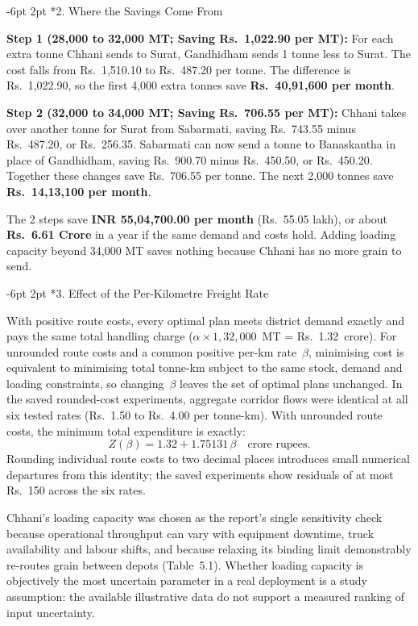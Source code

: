 \documentclass[10pt,a4paper]{article}
\makeatletter
\renewcommand\subsection{\@startsection{subsection}{2}{\z@}%
                                     {-6pt \@plus -2pt \@minus -1pt}%
                                     {2pt \@plus 1pt}%
                                     {\normalfont\large\bfseries}}
\makeatother
\begin{document}
\subsection*{2. Where the Savings Come From}
{\small \textbf{Step 1 (28,000 to 32,000 MT; Saving Rs.~1,022.90 per MT):}
For each extra tonne Chhani sends to Surat, Gandhidham sends 1 tonne less to Surat. The cost falls from Rs.~1,510.10 to Rs.~487.20 per tonne. The difference is Rs.~1,022.90, so the first 4,000 extra tonnes save \textbf{Rs.~40,91,600 per month}.

\textbf{Step 2 (32,000 to 34,000 MT; Saving Rs.~706.55 per MT):}
Chhani takes over another tonne for Surat from Sabarmati, saving Rs.~743.55 minus Rs.~487.20, or Rs.~256.35. Sabarmati can now send a tonne to Banaskantha in place of Gandhidham, saving Rs.~900.70 minus Rs.~450.50, or Rs.~450.20. Together these changes save Rs.~706.55 per tonne. The next 2,000 tonnes save \textbf{Rs.~14,13,100 per month}.

The 2 steps save \textbf{INR 55,04,700.00 per month} (Rs.~55.05 lakh), or about \textbf{Rs.~6.61 Crore} in a year if the same demand and costs hold. Adding loading capacity beyond 34,000 MT saves nothing because Chhani has no more grain to send.}

\subsection*{3. Effect of the Per-Kilometre Freight Rate}
{\small With positive route costs, every optimal plan meets district demand exactly and pays the same total handling charge ($\alpha \times 1{,}32{,}000$~MT = Rs.~1.32~crore). For unrounded route costs and a common positive per-km rate~$\beta$, minimising cost is equivalent to minimising total tonne-km subject to the same stock, demand and loading constraints, so changing~$\beta$ leaves the set of optimal plans unchanged. In the saved rounded-cost experiments, aggregate corridor flows were identical at all six tested rates (Rs.~1.50 to Rs.~4.00 per tonne-km). With unrounded route costs, the minimum total expenditure is exactly:
\[
Z(\beta) = 1.32 + 1.75131\,\beta \quad \text{crore rupees}.
\]
Rounding individual route costs to two decimal places introduces small numerical departures from this identity; the saved experiments show residuals of at most Rs.~150 across the six rates.

Chhani's loading capacity was chosen as the report's single sensitivity check because operational throughput can vary with equipment downtime, truck availability and labour shifts, and because relaxing its binding limit demonstrably re-routes grain between depots (Table~5.1). Whether loading capacity is objectively the most uncertain parameter in a real deployment is a study assumption: the available illustrative data do not support a measured ranking of input uncertainty.}
\end{document}
